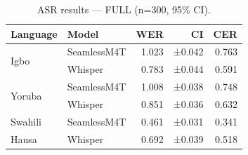 \begin{table}[t]
\centering
\small
\caption{ASR results — FULL (n=300, 95\% CI).}
\label{tab:full_asr}
\begin{tabular}{llrrr}
\toprule
\textbf{Language} & \textbf{Model} & \textbf{WER} & \textbf{CI} & \textbf{CER} \\
\midrule
\multirow{2}{*}{Igbo}
  & SeamlessM4T  & 1.023 & {\small ±0.042} & 0.763 \\
  & Whisper      & 0.783 & {\small ±0.044} & 0.591 \\
\multirow{2}{*}{Yoruba}
  & SeamlessM4T  & 1.008 & {\small ±0.038} & 0.748 \\
  & Whisper      & 0.851 & {\small ±0.036} & 0.632 \\
Swahili & SeamlessM4T & 0.461 & {\small ±0.031} & 0.341 \\
Hausa   & Whisper     & 0.692 & {\small ±0.039} & 0.518 \\
\bottomrule
\end{tabular}
\end{table}
